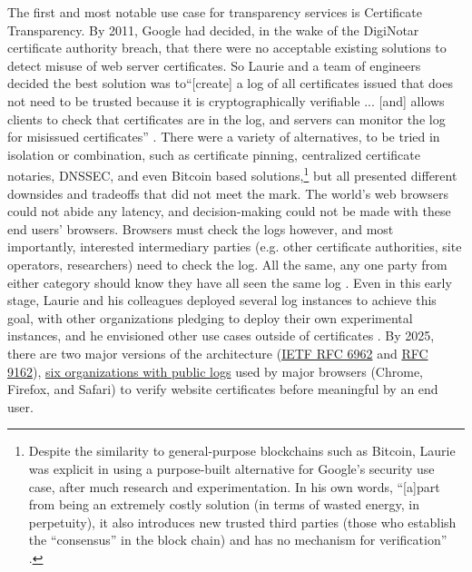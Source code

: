 \documentclass{jdf}
\begin{document}
The first and most notable use case for transparency services is Certificate Transparency. By 2011, Google had decided, in the wake of the DigiNotar certificate authority breach, that there were no acceptable existing solutions to detect misuse of web server certificates. So Laurie and a team of engineers decided the best solution was to``[create] a log of all certificates issued that does not need to be trusted because it is cryptographically verifiable ... [and] allows clients to check that certificates are in the log, and servers can monitor the log for misissued certificates'' \citeyear[p.~4]{laurie14}. There were a variety of alternatives, to be tried in isolation or combination, such as certificate pinning, centralized certificate notaries, DNSSEC, and even Bitcoin based solutions,\footnote{Despite the similarity to general-purpose blockchains such as Bitcoin, Laurie was explicit in using a purpose-built alternative for Google's security use case, after much research and experimentation. In his own words, ``[a]part from being an extremely costly solution (in terms of wasted energy, in perpetuity), it also introduces new trusted third parties (those who establish the “consensus” in the block chain) and has no mechanism for verification'' \citeyear[p.~4]{laurie14}.} but all presented different downsides and tradeoffs that did not meet the mark. The world's web browsers could not abide any latency, and decision-making could not be made with these end users' browsers. Browsers must check the logs however, and most importantly, interested intermediary parties (e.g. other certificate authorities, site operators, researchers) need to check the log. All the same, any one party from either category should know they have all seen the same log \cite[p.~7]{laurie14}. Even in this early stage, Laurie and his colleagues deployed several log instances to achieve this goal, with other organizations pledging to deploy their own experimental instances, and he envisioned other use cases outside of certificates \citeyear[pp.~809]{laurie14}. By 2025, there are two major versions of the architecture (\href{https://datatracker.ietf.org/doc/html/rfc6962}{IETF RFC 6962} and \href{https://datatracker.ietf.org/doc/html/rfc9162}{RFC 9162}), \href{https://certificate.transparency.dev/logs/}{six organizations with public logs} used by major browsers (Chrome, Firefox, and Safari) to verify website certificates before meaningful by an end user.
\end{document}
